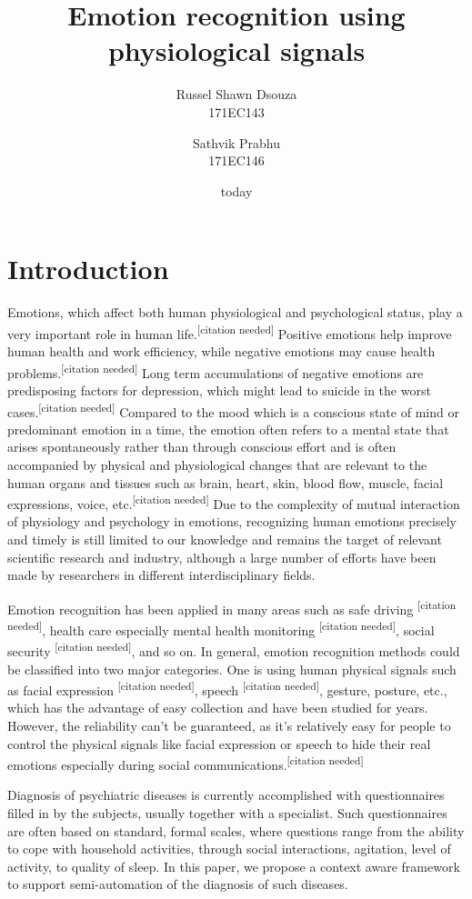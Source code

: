 \documentclass[11pt]{article}
\title{\textbf{Emotion recognition using physiological signals}}
\author{
  Russel Shawn Dsouza\\
  171EC143
  \and
  Sathvik Prabhu\\
  171EC146
}
\date{today}
\theoremstyle{definition}
\begin{document}
  \maketitle

  \section{Introduction}
    Emotions, which affect both human physiological and psychological status, play a very important role in human life.\textsuperscript{[citation needed]}
    Positive emotions help improve human health and work efficiency, while negative emotions may cause health problems.\textsuperscript{[citation needed]}
    Long term accumulations of negative emotions are predisposing factors for depression, which might lead to suicide in the worst cases.\textsuperscript{[citation needed]}
    Compared to the mood which is a conscious state of mind or predominant emotion in a time, the emotion often refers to a mental state that arises spontaneously rather than through conscious effort and is often accompanied by physical and physiological changes that are relevant to the human organs and tissues such as brain, heart, skin, blood flow, muscle, facial expressions, voice, etc.\textsuperscript{[citation needed]}
    Due to the complexity of mutual interaction of physiology and psychology in emotions, recognizing human emotions precisely and timely is still limited to our knowledge and remains the target of relevant scientific research and industry, although a large number of efforts have been made by researchers in different interdisciplinary fields.

    Emotion recognition has been applied in many areas such as safe driving \textsuperscript{[citation needed]}, health care especially mental health monitoring \textsuperscript{[citation needed]}, social security \textsuperscript{[citation needed]}, and so on. In general, emotion recognition methods could be classified into two major categories. One is using human physical signals such as facial expression \textsuperscript{[citation needed]}, speech \textsuperscript{[citation needed]}, gesture, posture, etc., which has the advantage of easy collection and have been studied for years. However, the reliability can’t be guaranteed, as it’s relatively easy for people to control the physical signals like facial expression or speech to hide their real emotions especially during social communications.\textsuperscript{[citation needed]}

    Diagnosis of psychiatric diseases is currently accomplished with questionnaires filled in by the subjects, usually together with a specialist. 
    Such questionnaires are often based on standard, formal scales, where questions range from the ability to cope with household activities, through social interactions, agitation, level of activity, to quality of sleep. 
    In this paper, we propose a context aware framework to support semi-automation of the diagnosis of such diseases.
\end{document}
